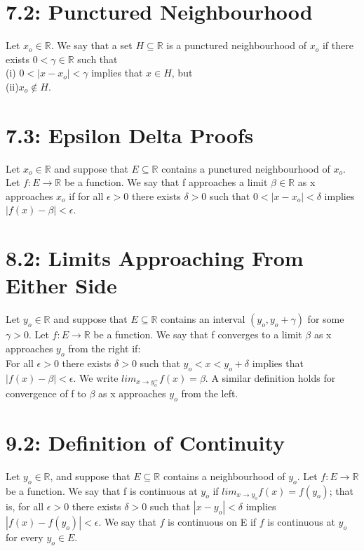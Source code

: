 \documentclass[10pt,letter]{report}
\begin{document}
\section*{7.2: Punctured Neighbourhood}
Let $x_o\in\mathbb{R}$. We say that a set $H \subseteq\mathbb{R}$ is a punctured neighbourhood of $x_o$ if there exists $0 < \gamma \in \mathbb{R}$ such that \\ 
(i) $0 < |x - x_o| < \gamma$ implies that $x \in H$, but\\
(ii)$x_o \not\in H$. \\ 

\section*{7.3: Epsilon Delta Proofs}
Let $x_o\in\mathbb{R}$ and suppose that $E\subseteq\mathbb{R}$ contains a punctured neighbourhood of $x_o$. Let $f: E\rightarrow\mathbb{R}$ be a function. We say that f approaches a limit $\beta\in\mathbb{R}$ as x approaches $x_o$ if for all $\epsilon>0$ there exists $\delta>0$ such that $0 < |x-x_o| < \delta$ implies $|f(x)-\beta| < \epsilon$. 

\section*{8.2: Limits Approaching From Either Side}
Let $y_o \in\mathbb{R}$ and suppose that $E \subseteq\mathbb{R}$ contains an interval $(y_o,y_o +\gamma)$ for some $\gamma>0$. Let $f: E\rightarrow\mathbb{R}$ be a function. We say that f converges to a limit $\beta$ as x approaches $y_o$ from the right if: \\ 
For all $\epsilon>0$ there exists $\delta>0$ such that $y_o<x<y_o+\delta$ implies that $|f(x)-\beta| < \epsilon$. We write $lim_{x\rightarrow y_o^+}f(x) = \beta$. A similar definition holds for convergence of f to $\beta$ as x approaches $y_o$ from the left. 

\section*{9.2: Definition of Continuity}
Let $y_o\in\mathbb{R}$, and suppose that $E\subseteq\mathbb{R}$ contains a neighbourhood of $y_o$. Let $f: E\rightarrow\mathbb{R}$ be a function. We say that f is continuous at $y_o$ if $lim_{x\rightarrow y_o}f(x) = f(y_o)$; that is, for all $\epsilon>0$ there exists $\delta>0$ such that $|x-y_o|<\delta$ implies $|f(x)-f(y_o)|<\epsilon$. We say that $f$ is continuous on E if $f$ is continuous at $y_o$ for every $y_o\in E$. 
\end{document}

